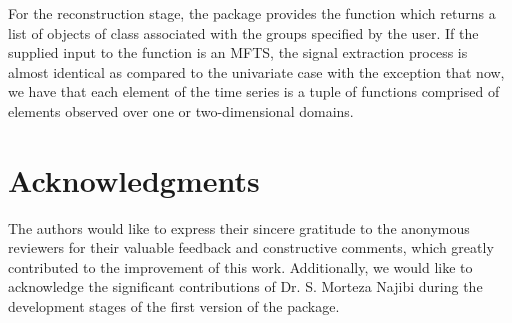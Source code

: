 For the reconstruction stage, the  package provides the function  which returns a list of objects of class  associated with the groups specified by the user. If the supplied input to the  function is an MFTS, the signal extraction process is almost identical as compared to the univariate case with the exception that now, we have that each element of the time series is a tuple of functions comprised of elements observed over one or two-dimensional domains.
\section*{Acknowledgments}
The authors would like to express their sincere gratitude to the anonymous reviewers for their valuable feedback and constructive comments, which greatly contributed to the improvement of this work.
Additionally, we would like to acknowledge the significant contributions of Dr. S. Morteza Najibi during the development stages of the first version of the  package. 

\address{Hossein Haghbin\\
	Artificial Intelligence and Data Mining Research Group, ICT Research Institute \\
	Faculty of Intelligent Systems Engineering and Data Science, Persian Gulf University\\ Boushehr, Iran\\
	(ORCiD 0000-0001-8416-2354)\\
	}
\address{Jordan Trinka\\
  Department of Mathematical and Statistical Sciences, Marquette University,\\
  Wisconsin, USA\\
  (ORCiD 0000-0001-9118-5781)\\
  }
\address{Mehdi Maadooliat\\
  Department of Mathematical and Statistical Sciences, Marquette University,\\
  Wisconsin, USA\\
  (ORCiD: 0000-0002-5408-2676)\\
  }
